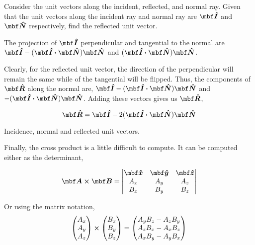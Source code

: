 \begin{example}
    Consider the unit vectors along the incident, reflected, and normal ray.
    Given that the unit vectors along the incident ray and normal ray are 
    \(\unitv{I}\) and \(\unitv{N}\) respectively, find the reflected unit vector.
    
    \begin{soln}
        The projection of \(\unitv{I}\) perpendicular and tangential to the 
        normal are \(\unitv{I} - (\unitv{I} \dtp \unitv{N})\unitv{N}\) and \((\unitv{I} \dtp \unitv{N})\unitv{N}\).

        Clearly, for the reflected unit vector, the direction of the perpendicular will remain the same 
        while of the tangential will be flipped. Thus, the components of 
        \(\unitv{R}\) along the normal are, \(\unitv{I} - (\unitv{I} \dtp \unitv{N})\unitv{N}\)
        and \(-(\unitv{I} \dtp \unitv{N})\unitv{N}\). Adding these vectors gives us \(\unitv{R}\),

        \begin{equation*}
            \unitv{R} = \unitv{I} - 2(\unitv{I} \dtp \unitv{N})\unitv{N}
        \end{equation*}
    \end{soln}
\end{example}

\begin{marginfigure}
    \centering
    \caption{Incidence, normal and reflected unit vectors.}
\end{marginfigure}


Finally, the cross product is a little difficult to compute.
It can be computed either as the determinant,

\[\Aa \cp \BB =
\begin{vmatrix}
    \unitv{x} & \unitv{y} & \unitv{z} \\
    A_x & A_y & A_z \\
    B_x & B_y & B_z
\end{vmatrix}\]

Or using the matrix notation,
\[
\begin{pmatrix}
    A_x \\
    A_y \\
    A_z
\end{pmatrix} \cp
%
\begin{pmatrix}
    B_x \\
    B_y \\
    B_z
\end{pmatrix}
%
=
%
\begin{pmatrix}
    A_yB_z - A_zB_y \\
    A_zB_x - A_xB_z \\
    A_xB_y - A_yB_x
\end{pmatrix}
\]


